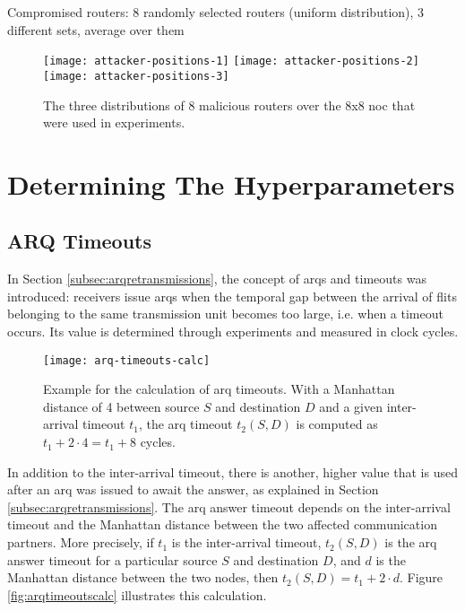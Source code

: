 Compromised routers: 8 randomly selected routers (uniform distribution), 3 different sets, average over them

\begin{figure}
    \texttt{[image: attacker-positions-1]}\hfill
    \texttt{[image: attacker-positions-2]}\hfill
    \texttt{[image: attacker-positions-3]}
    \caption[Malicious router distributions]{The three distributions of 8 malicious routers over the 8x8 \gls{noc} that were used in experiments.}
    \label{fig:attackerpositions}
\end{figure}

\section{Determining The Hyperparameters}
\subsection{ARQ Timeouts}\label{subsec:arqtimeouts}
In Section \ref{subsec:arqretransmissions}, the concept of \glspl{arq} and timeouts was introduced: receivers issue \glspl{arq} when the temporal gap
between the arrival of flits belonging to the same transmission unit becomes too large, i.e. when a timeout occurs. Its value is determined through
experiments and measured in clock cycles.

\begin{figure}
    \centering
    \texttt{[image: arq-timeouts-calc]}
    \caption[Example of ARQ timeout calculation]{Example for the calculation of \gls{arq} timeouts. With a Manhattan distance of 4 between source $S$ and
    destination $D$ and a given inter-arrival timeout $t_1$, the \gls{arq} timeout $t_2(S, D)$ is computed as $t_1 + 2 \cdot 4 = t_1 + 8$ cycles.}
    \label{fig:arqtimeoutscalc}
\end{figure}

In addition to the inter-arrival timeout, there is another, higher value that is used after an \gls{arq} was issued to await the answer, as explained
in Section \ref{subsec:arqretransmissions}. The \gls{arq} answer timeout depends on the inter-arrival timeout and the Manhattan distance between the
two affected communication partners. More precisely, if $t_1$ is the inter-arrival timeout, $t_2(S, D)$ is the \gls{arq} answer timeout for a
particular source $S$ and destination $D$, and $d$ is the Manhattan distance between the two nodes, then $t_2(S, D) = t_1 + 2 \cdot d$. Figure
\vref{fig:arqtimeoutscalc} illustrates this calculation.

